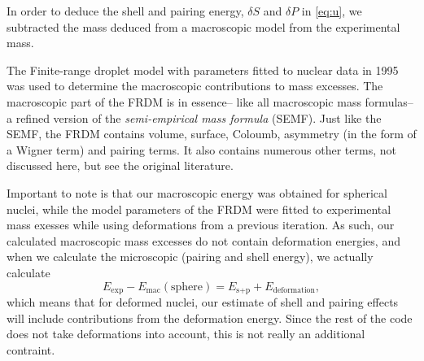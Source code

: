 In order to deduce the shell and pairing energy, $\delta S$ and $\delta P$ in \eqref{eq:u}, we subtracted the mass deduced from a macroscopic model from the experimental mass.

The Finite-range droplet model with parameters fitted to nuclear data in 1995\cite{moller1995} was used to determine the macroscopic contributions to mass excesses. The macroscopic part of the FRDM is in essence-- like all macroscopic mass formulas-- a refined version of the \emph{semi-empirical mass formula} (SEMF). Just like the SEMF, the FRDM contains volume, surface, Coloumb, asymmetry (in the form of a Wigner term) and pairing terms. It also contains numerous other terms, not discussed here, but see the original literature\cite{moller1995}.

Important to note is that our macroscopic energy was obtained for spherical nuclei, while the model parameters of the FRDM were fitted to experimental mass exesses while using deformations from a previous iteration. As such, our calculated macroscopic mass excesses do not contain deformation energies, and when we calculate the microscopic (pairing and shell energy), we actually calculate
\begin{equation}
E_\text{exp} - E_\text{mac}(\text{sphere}) = E_{\text{s}+\text{p}} + E_\text{deformation},
\end{equation}
which means that for deformed nuclei, our estimate of shell and pairing effects will include contributions from the deformation energy.
Since the rest of the code does not take deformations into account, this is not really an additional contraint.%

